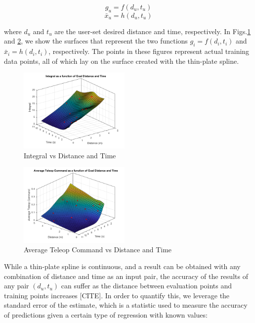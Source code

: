 \documentclass[letterpaper, 10 pt, conference]{ieeeconf}  %
\newcommand\NB[1]{$\spadesuit$\footnote{NB: #1}}
\begin{document}
\begin{equation} \label{eq:integralfit}
g_u = f(d_u,t_u)
\end{equation}
\begin{equation} \label{eq:ssvelfit}
\bar{x}_u = h(d_u,t_u)
\end{equation}

where $d_u$ and $t_u$ are the user-set desired distance and time, respectively. In Figs.\ref{fig:integs} and \ref{fig:joys}, we show the surfaces that represent the two functions $g_i = f(d_i,t_i)$ and $\bar{x}_i = h(d_i,t_i)$, respectively. The points in these figures represent actual training data points, all of which lay on the surface created with the thin-plate spline.

\begin{figure}[ht]
    \includegraphics[width=0.48\textwidth]{images/integs.png}
    \caption{Integral vs Distance and Time}
    \label{fig:integs}
\end{figure}
\begin{figure}[ht]
    \includegraphics[width=0.48\textwidth]{images/joycmds.png}
    \caption{Average Teleop Command vs Distance and Time}
    \label{fig:joys}
\end{figure}

While a thin-plate spline is continuous, and a result can be obtained with any combination of distance and time as an input pair, the accuracy of the results of any pair $(d_u,t_u)$ can suffer as the distance between evaluation points and training points increases [CITE]. In order to quantify this, we leverage the standard error of the estimate, which is a statistic used to measure the accuracy of predictions given a certain type of regression with known values:
\end{document}

